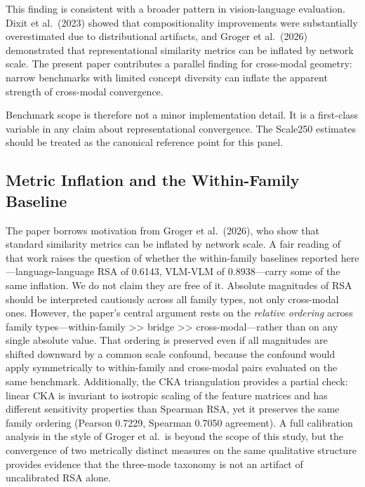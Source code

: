\documentclass[11pt,a4paper]{article}
\begin{document}
This finding is consistent with a broader pattern in vision-language
evaluation. Dixit et al.~(2023) showed that compositionality
improvements were substantially overestimated due to distributional
artifacts, and Groger et al.~(2026) demonstrated that representational
similarity metrics can be inflated by network scale. The present paper
contributes a parallel finding for cross-modal geometry: narrow
benchmarks with limited concept diversity can inflate the apparent
strength of cross-modal convergence.

Benchmark scope is therefore not a minor implementation detail. It is a
first-class variable in any claim about representational convergence.
The Scale250 estimates should be treated as the canonical reference
point for this panel.

\subsection{Metric Inflation and the Within-Family
Baseline}\label{metric-inflation-and-the-within-family-baseline}

The paper borrows motivation from Groger et al.~(2026), who show that
standard similarity metrics can be inflated by network scale. A fair
reading of that work raises the question of whether the within-family
baselines reported here---language-language RSA of 0.6143, VLM-VLM of
0.8938---carry some of the same inflation. We do not claim they are free
of it. Absolute magnitudes of RSA should be interpreted cautiously
across all family types, not only cross-modal ones. However, the paper's
central argument rests on the \emph{relative ordering} across family
types---within-family \textgreater\textgreater{} bridge
\textgreater\textgreater{} cross-modal---rather than on any single
absolute value. That ordering is preserved even if all magnitudes are
shifted downward by a common scale confound, because the confound would
apply symmetrically to within-family and cross-modal pairs evaluated on
the same benchmark. Additionally, the CKA triangulation provides a
partial check: linear CKA is invariant to isotropic scaling of the
feature matrices and has different sensitivity properties than Spearman
RSA, yet it preserves the same family ordering (Pearson 0.7229, Spearman
0.7050 agreement). A full calibration analysis in the style of Groger et
al.~is beyond the scope of this study, but the convergence of two
metrically distinct measures on the same qualitative structure provides
evidence that the three-mode taxonomy is not an artifact of uncalibrated
RSA alone.
\end{document}
